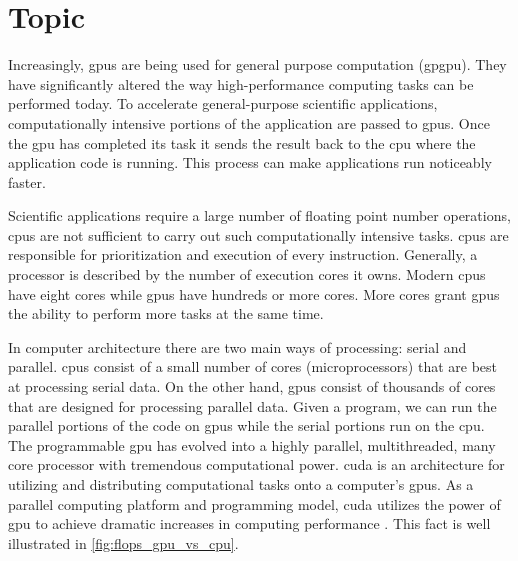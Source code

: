 \section{Topic}

Increasingly, \Glspl{gpu} are being used for general purpose computation
(\gls{gpgpu}). They have significantly altered the way high-performance
computing tasks can be performed today. To accelerate general-purpose
scientific applications, computationally intensive portions of the application
are passed to \glspl{gpu}. Once the \gls{gpu} has completed its task it sends
the result back to the \Gls{cpu} where the application code is running. This
process can make applications run noticeably faster.

Scientific applications require a large number of floating point number
operations, \Glspl{cpu} are not sufficient to carry out such computationally
intensive tasks. \glspl{cpu} are responsible for prioritization and execution
of every instruction. Generally, a processor is described by the number of
execution cores it owns. Modern \glspl{cpu} have eight cores while \Glspl{gpu}
have hundreds or more cores. More cores grant \glspl{gpu} the ability to
perform more tasks at the same time.

In computer architecture there are two main ways of processing: serial and
parallel. \Glspl{cpu} consist of a small number of cores (microprocessors) that
are best at processing serial data. On the other hand, \glspl{gpu} consist of
thousands of cores that are designed for processing parallel data. Given a
program, we can run the parallel portions of the code on \glspl{gpu} while the
serial portions run on the \gls{cpu}\@. The programmable \gls{gpu} has evolved
into a highly parallel, multithreaded, many core processor with tremendous
computational power. \Gls{cuda} is an architecture for utilizing and
distributing computational tasks onto a computer's \glspl{gpu}. As a parallel
computing platform and programming model, \gls{cuda} utilizes the power of
\gls{gpu} to achieve dramatic increases in computing performance
\cite{website:cudaCProgrammingGuide}. This fact is well illustrated in
\cref{fig:flops_gpu_vs_cpu}.

